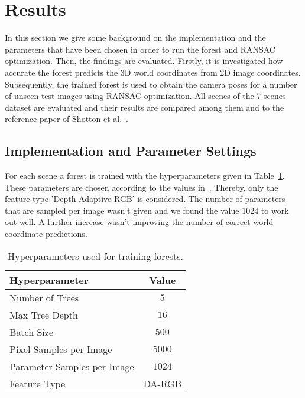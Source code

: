 \documentclass[final]{cvpr}
\begin{document}

\section{Results}
In this section we give some background on the implementation and the parameters that have been chosen in order to 
run the forest and RANSAC optimization. Then, the findings are evaluated. Firstly, it is investigated how accurate the 
forest predicts the 3D world coordinates from 2D image coordinates. Subsequently, the trained forest is used to obtain 
the camera poses for a number of unseen test images using RANSAC optimization. All scenes of the 7-scenes dataset 
are evaluated and their results are compared among them and to the reference paper of Shotton et al.~\cite{shotton2013}. 

\subsection{Implementation and Parameter Settings}
For each scene a forest is trained with the hyperparameters given in Table~\ref{tab:params-forest}. These parameters are 
chosen according to the values in~\cite{shotton2013}. Thereby, only the feature type 'Depth Adaptive RGB' is considered. The number of 
parameters that are sampled per image wasn't given and we found the value $1024$ to work out well. A further increase wasn't 
improving the number of correct world coordinate predictions.
\begin{table}[h!]
	\begin{center}
	\begin{tabular}{|l|c|}
	\hline
	Hyperparameter & Value \\
	\hline\hline
	Number of Trees & $5$ \\
	Max Tree Depth & $16$ \\
	Batch Size & $500$ \\
	Pixel Samples per Image & $5000$ \\
	Parameter Samples per Image  & $1024$ \\
	Feature Type & DA-RGB \\
	\hline
	\end{tabular}
	\end{center}
	\label{tab:params-forest}
	\caption{Hyperparameters used for training forests.}
\end{table}
\end{document}
